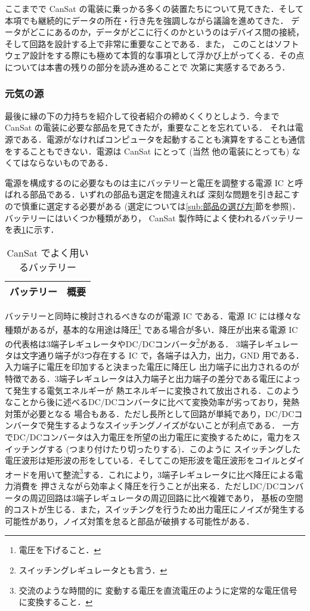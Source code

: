 \documentclass[dvipdfmx]{jsarticle}
\begin{document}
ここまでで CanSat の電装に乗っかる多くの装置たちについて見てきた．そして本項でも継続的にデータの所在・行き先を強調しながら議論を進めてきた．
データがどこにあるのか，データがどこに行くのかというのはデバイス間の接続，そして回路を設計する上で非常に重要なことである．また，
このことはソフトウェア設計をする際にも極めて本質的な事項として浮かび上がってくる．その点については本書の残りの部分を読み進めることで
次第に実感するであろう．

\subsubsection{元気の源}

最後に縁の下の力持ちを紹介して役者紹介の締めくくりとしよう．今まで CanSat の電装に必要な部品を見てきたが，重要なことを忘れている．
それは電源である．電源がなければコンピュータを起動することも演算をすることも通信をすることもできない．電源は CanSat にとって (当然
他の電装にとっても) なくてはならないものである．

電源を構成するのに必要なものは主にバッテリーと電圧を調整する電源 IC と呼ばれる部品である．いずれの部品も選定を間違えれば
深刻な問題を引き起こすので慎重に選定する必要がある (選定については\ref{sub:部品の選び方}節を参照)．バッテリーにはいくつか種類があり，
CanSat 製作時によく使われるバッテリーを表\ref{tab:2.2.4-battery}に示す．

\begin{table}[htbp]
  \centering
  \caption{CanSat でよく用いるバッテリー}
  \begin{tabular}{c|r} \hline
    バッテリー & 概要 \\ \hline
  \end{tabular}
  \label{tab:2.2.4-battery}
\end{table}

バッテリーと同時に検討されるべきなのが電源 IC である．電源 IC には様々な種類があるが，基本的な用途は降圧\footnote{電圧を下げること．}
である場合が多い．降圧が出来る電源 IC の代表格は3端子レギュレータやDC/DCコンバータ\footnote{スイッチングレギュレータとも言う．}がある．
3端子レギュレータは文字通り端子が3つ存在する IC で，各端子は入力，出力，GND 用である．入力端子に電圧を印加すると決まった電圧に降圧し
出力端子に出力されるのが特徴である．3端子レギュレータは入力端子と出力端子の差分である電圧によって発生する電気エネルギーが
熱エネルギーに変換されて放出される．このようなことから後に述べるDC/DCコンバータに比べて変換効率が劣っており，発熱対策が必要となる
場合もある．ただし長所として回路が単純であり，DC/DCコンバータで発生するようなスイッチングノイズがないことが利点である．
一方でDC/DCコンバータは入力電圧を所望の出力電圧に変換するために，電力をスイッチングする (つまり付けたり切ったりする)．このように
スイッチングした電圧波形は矩形波の形をしている．そしてこの矩形波を電圧波形をコイルとダイオードを用いて整流\footnote{交流のような時間的に
変動する電圧を直流電圧のように定常的な電圧信号に変換すること．}する．これにより，3端子レギュレータに比べ降圧による電力消費を
押さえながら効率よく降圧を行うことが出来る．ただしDC/DCコンバータの周辺回路は3端子レギュレータの周辺回路に比べ複雑であり，
基板の空間的コストが生じる．また，スイッチングを行うため出力電圧にノイズが発生する可能性があり，ノイズ対策を怠ると部品が破損する可能性がある．
\end{document}
